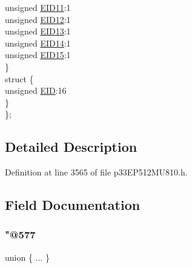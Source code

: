 \begin{DoxyCompactItemize}
\begin{tabbing}
\>\>unsigned \hyperlink{structtag_c1_r_x_m1_e_i_d_b_i_t_s_a710bdb0d602deb021b0be99066008018}{EID11}:1\\
\>\>unsigned \hyperlink{structtag_c1_r_x_m1_e_i_d_b_i_t_s_aa347bb85867bd8d4e0124f7cff8c6472}{EID12}:1\\
\>\>unsigned \hyperlink{structtag_c1_r_x_m1_e_i_d_b_i_t_s_a37d5f3edcbf6ef62f848fd4f3c584f79}{EID13}:1\\
\>\>unsigned \hyperlink{structtag_c1_r_x_m1_e_i_d_b_i_t_s_a7ffc0b0e0d99b8476b6f9a45337c17ab}{EID14}:1\\
\>\>unsigned \hyperlink{structtag_c1_r_x_m1_e_i_d_b_i_t_s_a293cd7dc1746257fa75a60cbd9383cd7}{EID15}:1\\
\>\} \\
\>struct \{\\
\>\>unsigned \hyperlink{structtag_c1_r_x_m1_e_i_d_b_i_t_s_ae80b378c9141f7c03e0b4e55b5f4b54d}{EID}:16\\
\>\} \\
\}; \\

\end{tabbing}\end{DoxyCompactItemize}


\subsection{Detailed Description}


Definition at line 3565 of file p33\+E\+P512\+M\+U810.\+h.



\subsection{Field Documentation}
\mbox{\label{structtag_c1_r_x_m1_e_i_d_b_i_t_s_a4f630e4a873bbef594fb3e1ec51e3dca}} 
\subsubsection{\texorpdfstring{"@577}{@577}}
{\footnotesize\ttfamily union \{ ... \} }

\mbox{\label{structtag_c1_r_x_m1_e_i_d_b_i_t_s_ae80b378c9141f7c03e0b4e55b5f4b54d}} 
